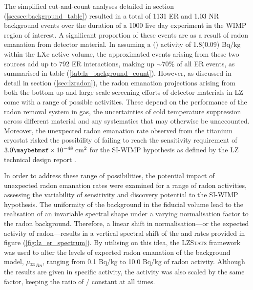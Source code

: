 {The simplified cut-and-count analyses detailed in section (\ref{secsec:background_table}) resulted in a total of 1131 ER and 1.03 NR background events over the duration of a 1000 live day experiment in the WIMP region of interest. A significant proportion of these events are as a result of radon emanation from detector material. In assuming a \RnTTT{}(\RnTTZ{}) activity of 1.8(0.09) \micro{}Bq/kg within the LXe active volume, the approximated events arising from these two sources add up to 792 ER interactions, making up $\sim70\%$ of all ER events, as summarised in table (\ref{tab:lz_background_count}). However, as discussed in detail in section (\ref{sec:lzradon}), the radon emanation projections arising from both the bottom-up and large scale screening efforts of detector materials in LZ come with a range of possible activities. These depend on the performance of the radon removal system in gas, the uncertainties of cold temperature suppression across different material and any systematics that may otherwise be unaccounted. Moreover, the unexpected radon emanation rate observed from the titanium cryostat risked the possibility of failing to reach the sensitivity requirement of $3.0 \times 10^{-48} \; \MathText{cm}^2$ for the SI-WIMP hypothesis as defined by the LZ technical design report \cite{lz_tdr}. 

In order to address these range of possibilities, the potential impact of unexpected radon emanation rates were examined for a range of radon activities, assessing the variability of sensitivity and discovery potential to the SI-WIMP hypothesis. The uniformity of the \RnTTT{} background in the fiducial volume lead to the realisation of an invariable spectral shape under a varying normalisation factor to the radon background. Therefore, a linear shift in normalisation---or the expected activity of radon---results in a vertical spectral shift of the \RnTTT{} and \RnTTZ{} rates provided in figure (\ref{fig:lz_er_spectrum}). By utilising on this idea, the \textsc{LZStats} framework was used to alter the levels of expected radon emanation of the background model, $\mu_{^{222}Rn}$, ranging from 0.1 \micro{}Bq/kg to 10.0 \micro{}Bq/kg of radon activity. Although the results are given in \RnTTT{} specific activity, the \RnTTZ{} activity was also scaled by the same factor, keeping the ratio of \RnTTT{}/\RnTTZ{} constant at all times. 

}
